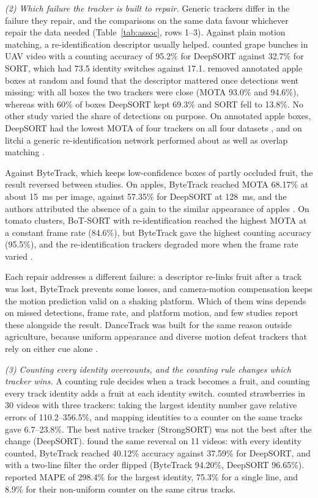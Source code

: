 \textit{(2) Which failure the tracker is built to repair.} Generic trackers differ in the failure they repair, and the comparisons on the same data favour whichever repair the data needed (Table~\ref{tab:assoc}, rows 1--3). Against plain motion matching, a re-identification descriptor usually helped. \citet{piazolo2026enhanced} counted grape bunches in UAV video with a counting accuracy of 95.2\% for DeepSORT against 32.7\% for SORT, which had 73.5 identity switches against 17.1. \citet{villacres2023apple} removed annotated apple boxes at random and found that the descriptor mattered once detections went missing: with all boxes the two trackers were close (MOTA 93.0\% and 94.6\%), whereas with 60\% of boxes DeepSORT kept 69.3\% and SORT fell to 13.8\%. No other study varied the share of detections on purpose. On annotated apple boxes, DeepSORT had the lowest MOTA of four trackers on all four datasets \citep{matos2024tracking}, and on litchi a generic re-identification network performed about as well as overlap matching \citep{lu2025iot}.

Against ByteTrack, which keeps low-confidence boxes of partly occluded fruit, the result reversed between studies. On apples, ByteTrack reached MOTA 68.17\% at about 15~ms per image, against 57.35\% for DeepSORT at 128~ms, and the authors attributed the absence of a gain to the similar appearance of apples \citep{genemola2023video}. On tomato clusters, BoT-SORT with re-identification reached the highest MOTA at a constant frame rate (84.6\%), but ByteTrack gave the highest counting accuracy (95.5\%), and the re-identification trackers degraded more when the frame rate varied \citep{qi2025assessment}.

Each repair addresses a different failure: a descriptor re-links fruit after a track was lost, ByteTrack prevents some losses, and camera-motion compensation keeps the motion prediction valid on a shaking platform. Which of them wins depends on missed detections, frame rate, and platform motion, and few studies report these alongside the result. DanceTrack was built for the same reason outside agriculture, because uniform appearance and diverse motion defeat trackers that rely on either cue alone \citep{sun2022dancetrack}.

\textit{(3) Counting every identity overcounts, and the counting rule changes which tracker wins.} A counting rule decides when a track becomes a fruit, and counting every track identity adds a fruit at each identity switch. \citet{zhou2024advancing} counted strawberries in 30 videos with three trackers: taking the largest identity number gave relative errors of 110.2--356.5\%, and mapping identities to a counter on the same tracks gave 6.7--23.8\%. The best native tracker (StrongSORT) was not the best after the change (DeepSORT). \citet{zhang2025row} found the same reversal on 11 videos: with every identity counted, ByteTrack reached 40.12\% accuracy against 37.59\% for DeepSORT, and with a two-line filter the order flipped (ByteTrack 94.20\%, DeepSORT 96.65\%). \citet{zheng2023efficient} reported MAPE of 298.4\% for the largest identity, 75.3\% for a single line, and 8.9\% for their non-uniform counter on the same citrus tracks.

